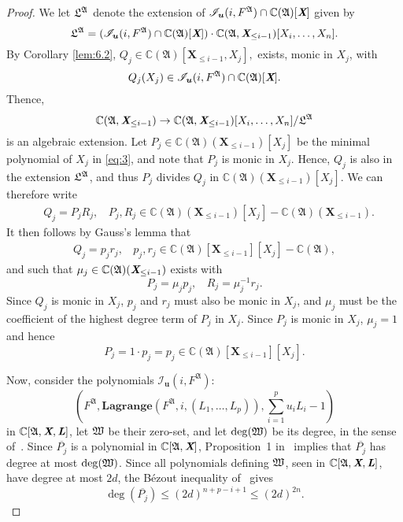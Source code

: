 \documentclass[12pt]{article}
\def\A{\mathfrak{A}}
\def\Lb{\textit{\textbf{L}}}
\def\Xb{\textit{\textbf{X}}}
\def\ub{{\bm u}}
\def\pjb{\overline{P_{j}}}
\def\C{\mathbb{C}}
\def\lagFfA{{\bm{Lagrange}}(F^{\A},i,(L_1,\hdots,L_p))}
\def\IilfA{\mathscr{I}_{\ub}(i,F^{\A})}
\def\udl{\sum_{i=1}^pu_iL_i}
\begin{document}
\begin{proof}
     We let $\frak L^\A$ denote the extension of $\IilfA \cap \C(\A)[\Xb]$ given by 
  \[
  \frak
  L^\A =(\IilfA \cap \C(\A)[\Xb])\cdot \C(\frak A, \Xb_{\leq i-1})[X_i,\dots,X_n].
  \]
  By Corollary \ref{lem:6.2}, $Q_j\in\C(\A)[\textbf{X}_{\leq i-1},X_j],$ exists, monic in $X_j$, with 
    \[
    Q_j(X_j) \in \IilfA \cap \C(\A)[\Xb].
    \]
  Thence,
  \begin{equation}\label{eq:3}
    \C(\frak A, \Xb_{\leq i-1}) \to \C(\frak A,
    \Xb_{\leq i-1})[X_i,\dots,X_n]/\frak L^\A
  \end{equation}
    is an algebraic extension. Let $P_j \in \C(\A)(\textbf{X}_{\leq i-1})[X_j]$ 
be the minimal polynomial of $X_j$ in \eqref{eq:3}, and note that $P_j$ is monic in $X_j.$ 
    Hence, $Q_j$ is also in the extension $\frak{L}^\A$, and thus $P_j$ divides $Q_j$ in $\C(\A)(\textbf{X}_{\leq i-1})[X_j].$ We can therefore write 
    \begin{align*}
    &Q_j = P_jR_j,~~~~ P_j,R_j \in \C(\A)(\textbf{X}_{\leq i-1})[X_j]-\C(\A)(\textbf{X}_{\leq i-1}).
    \end{align*}
    It then follows by Gauss's lemma that 
    \begin{align*}
    Q_j = p_jr_j, ~~~~p_j,r_j \in \C(\A)[\textbf{X}_{\leq i-1}][X_j]-\C(\A),
    \end{align*}
    and such that $\mu_j \in \C(\A)(\Xb_{\leq i-1})$ exists with 
    \[
    P_j = \mu_j p_j,~~~~ R_j = \mu_j^{-1}r_j.
    \]
    Since $Q_j$ is monic in $X_j$, $p_j$ and $r_j$ must also be monic in $X_j$, and $\mu_j$ must be the coefficient of the highest degree term of $P_j$ in $X_j.$ Since $P_j$ is monic in $X_j$, $\mu_j =1$ and hence \[P_j=1\cdot p_j=p_j \in \C(\A)[\textbf{X}_{\leq i-1}][X_j].\]

  \noindent 
  Now, consider the polynomials $\IilfA:$
\[
 \left(F^{\A}, \lagFfA,\udl-1 \right)
\]
in $\C[\A,\Xb,\Lb]$, let $\frak W$ be their zero-set, and let $\deg(\frak W)$ be its
  degree, in the sense of~\cite{H}. Since $\pjb$ is a polynomial in $\C[\A,\Xb]$, Proposition~1 in~\cite{CGR} 
  implies that $\pjb$ has degree at most $\deg(\frak W)$. Since all
  polynomials defining $\frak W$, seen in $\C[\A,\Xb,\Lb]$, have
  degree at most $2d$, the B\'ezout inequality of~\cite{H} gives
  \[\deg(\pjb) \le (2d)^{n+p-i+1} \le (2d)^{2n}.\]
\end{proof}





\end{document}
